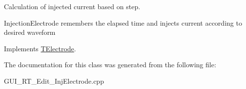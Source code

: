 Calculation of injected current based on step. 

Injection\+Electrode remembers the elapsed time and injects current according to desired waveform 

Implements \hyperlink{class_t_electrode_a3b535fa8d277cf8245f99900fc32ce99}{T\+Electrode}.



The documentation for this class was generated from the following file\+:\begin{DoxyCompactItemize}
\item 
G\+U\+I\+\_\+\+R\+T\+\_\+\+Edit\+\_\+\+Inj\+Electrode.\+cpp\end{DoxyCompactItemize}
